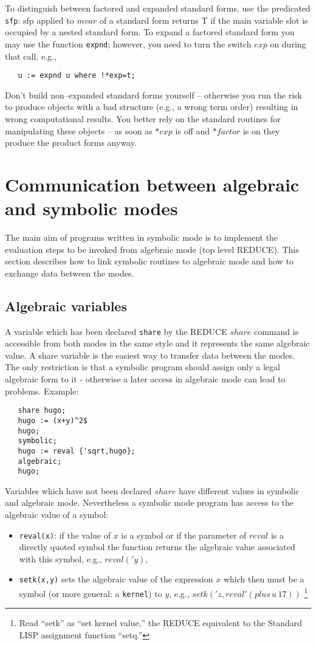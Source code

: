 \documentclass[11pt]{article}
\makeatletter
\newcommand{\reduce}{\small REDUCE}
\newcommand{\ttindex}[1]{\index{#1@{\texttt{#1}}}}
\makeatother
\begin{document}
To distinguish between factored and expanded standard forms, use the
predicated \texttt{sfp}: sfp applied to $mvar$ of a standard form returns T
if the main variable slot is occupied by a nested standard form.
To expand a factored standard form you may use the function \texttt{expnd};
however, you need to turn the switch $exp$ on
during that call, e.g.,
\begin{verbatim}
   u := expnd u where !*exp=t;
\end{verbatim}
Don't build non--expanded standard forms yourself -- otherwise you run
the risk to produce objects with a bad structure (e.g., a wrong term
order) resulting in wrong computational results. You better rely on the
standard routines for manipulating these objects -- as soon as
$*exp$ is off and $*factor$ is on they produce the product forms
anyway.
\section{Communication between algebraic and symbolic modes}

The main aim of programs written in symbolic mode
is to implement the evaluation steps to be invoked from
algebraic mode (top level {\reduce}). This section describes
how to link symbolic routines to algebraic mode
and how to exchange data between the modes.


\subsection{Algebraic variables}

A variable which has been declared \texttt{share}\ttindex{share} by the {\reduce}
$share$ command is accessible from both modes in the
same style and it represents the same algebraic value.
A share variable is the easiest way to transfer data
between the modes. The only restriction is that a
symbolic program should assign only a legal algebraic
form to it - otherwise a later access in algebraic mode
can lead to problems. Example:

\begin{verbatim}
   share hugo;
   hugo := (x+y)^2$
   hugo;
   symbolic;
   hugo := reval {'sqrt,hugo};
   algebraic;
   hugo;
\end{verbatim}

Variables which have not been declared $share$ have
different values in symbolic and algebraic mode.
Nevertheless a symbolic mode program has access to the
algebraic value of a symbol:
\begin{itemize}
\item \texttt{reval(x)}\ttindex{reval}: if the value of $x$ is a symbol
or if the parameter of $reval$ is a directly quoted symbol
the function returns the algebraic value associated with this
symbol, e.g., $reval('y)$,
\item \texttt{setk}\ttindex{setk}\texttt{(x,y)} sets the algebraic value of the expression
 $x$ which then must be a symbol (or more general:
a \texttt{kernel}\ttindex{kernel})
to  $y$, e.g., $setk('z,reval'(plus\, u\, 17))$
\footnote{Read ``setk'' as ``set kernel value,'' the {\reduce}
equivalent to the Standard LISP assignment function ``setq.''}
\end{itemize}
\end{document}
